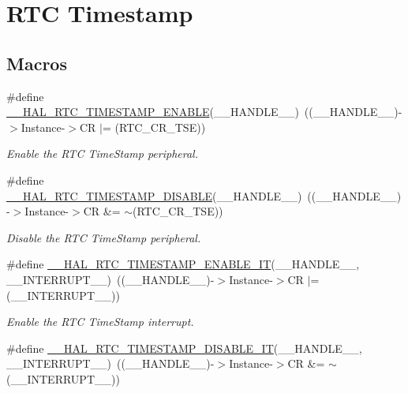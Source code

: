 \hypertarget{group___r_t_c_ex___timestamp}{}\section{R\+TC Timestamp}
\label{group___r_t_c_ex___timestamp}
\subsection*{Macros}
\begin{DoxyCompactItemize}
\item 
\#define \hyperlink{group___r_t_c_ex___timestamp_gad8400feb7b3dae2c552f2f4a7556bc6d}{\+\_\+\+\_\+\+H\+A\+L\+\_\+\+R\+T\+C\+\_\+\+T\+I\+M\+E\+S\+T\+A\+M\+P\+\_\+\+E\+N\+A\+B\+LE}(\+\_\+\+\_\+\+H\+A\+N\+D\+L\+E\+\_\+\+\_\+)~((\+\_\+\+\_\+\+H\+A\+N\+D\+L\+E\+\_\+\+\_\+)-\/$>$Instance-\/$>$CR $\vert$= (R\+T\+C\+\_\+\+C\+R\+\_\+\+T\+SE))
\begin{DoxyCompactList}\small\item\em Enable the R\+TC Time\+Stamp peripheral. \end{DoxyCompactList}\item 
\#define \hyperlink{group___r_t_c_ex___timestamp_ga7281d85b199bee5eb74cc135208051fa}{\+\_\+\+\_\+\+H\+A\+L\+\_\+\+R\+T\+C\+\_\+\+T\+I\+M\+E\+S\+T\+A\+M\+P\+\_\+\+D\+I\+S\+A\+B\+LE}(\+\_\+\+\_\+\+H\+A\+N\+D\+L\+E\+\_\+\+\_\+)~((\+\_\+\+\_\+\+H\+A\+N\+D\+L\+E\+\_\+\+\_\+)-\/$>$Instance-\/$>$CR \&= $\sim$(R\+T\+C\+\_\+\+C\+R\+\_\+\+T\+SE))
\begin{DoxyCompactList}\small\item\em Disable the R\+TC Time\+Stamp peripheral. \end{DoxyCompactList}\item 
\#define \hyperlink{group___r_t_c_ex___timestamp_ga054429581f55a80d922bb5c1e982c06f}{\+\_\+\+\_\+\+H\+A\+L\+\_\+\+R\+T\+C\+\_\+\+T\+I\+M\+E\+S\+T\+A\+M\+P\+\_\+\+E\+N\+A\+B\+L\+E\+\_\+\+IT}(\+\_\+\+\_\+\+H\+A\+N\+D\+L\+E\+\_\+\+\_\+,  \+\_\+\+\_\+\+I\+N\+T\+E\+R\+R\+U\+P\+T\+\_\+\+\_\+)~((\+\_\+\+\_\+\+H\+A\+N\+D\+L\+E\+\_\+\+\_\+)-\/$>$Instance-\/$>$CR $\vert$= (\+\_\+\+\_\+\+I\+N\+T\+E\+R\+R\+U\+P\+T\+\_\+\+\_\+))
\begin{DoxyCompactList}\small\item\em Enable the R\+TC Time\+Stamp interrupt. \end{DoxyCompactList}\item 
\#define \hyperlink{group___r_t_c_ex___timestamp_gab455d21f8afb5b3d49f2c25e34ce90c2}{\+\_\+\+\_\+\+H\+A\+L\+\_\+\+R\+T\+C\+\_\+\+T\+I\+M\+E\+S\+T\+A\+M\+P\+\_\+\+D\+I\+S\+A\+B\+L\+E\+\_\+\+IT}(\+\_\+\+\_\+\+H\+A\+N\+D\+L\+E\+\_\+\+\_\+,  \+\_\+\+\_\+\+I\+N\+T\+E\+R\+R\+U\+P\+T\+\_\+\+\_\+)~((\+\_\+\+\_\+\+H\+A\+N\+D\+L\+E\+\_\+\+\_\+)-\/$>$Instance-\/$>$CR \&= $\sim$(\+\_\+\+\_\+\+I\+N\+T\+E\+R\+R\+U\+P\+T\+\_\+\+\_\+))

\end{DoxyCompactItemize}
